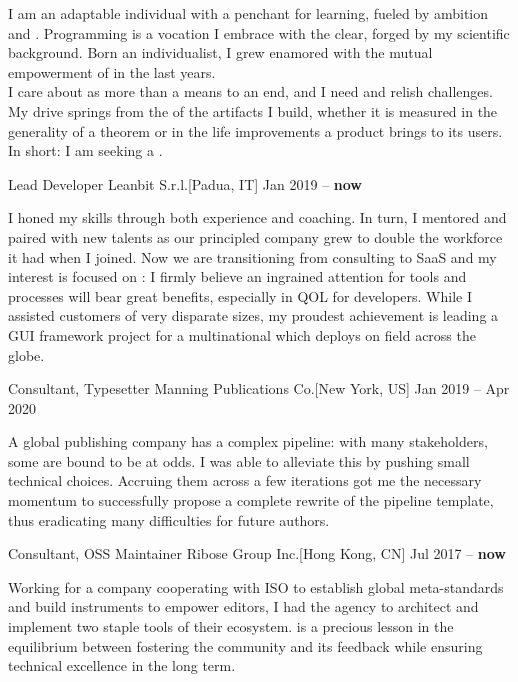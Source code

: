 \documentclass[9pt]{scrartcl}
\def\Phi{1.618}
\newlength{\Pad}\setlength{\Pad}{14.562pt} %
\begin{document}

I am an adaptable individual with a penchant for learning, fueled by ambition
and .
Programming is a vocation I embrace with the clear, 
forged by my scientific background.
Born an individualist, I grew enamored with the mutual empowerment of
 in the last years.\\[\smallskipamount]
I care about  as more than a means to an end, and
I need and relish challenges.
My drive springs from the  of the artifacts I build, whether
it is measured in the generality of a theorem or in the life improvements a
product brings to its users. In short: I am seeking a .


\Event
  {Lead Developer}
  {Leanbit S.r.l.}[Padua, IT]
  {Jan 2019 -- \textbf{now}}

I honed my  skills through both experience and coaching. In
turn, I mentored and paired with new talents as our  principled company
grew to double the workforce it had when I joined.
%
Now we are transitioning from consulting to SaaS and my interest is focused on
: I firmly believe an ingrained attention for
tools and processes will bear great benefits, especially in QOL for
developers.
%
While I assisted customers of very disparate sizes, my proudest achievement is
leading a GUI framework project for a multinational which deploys on field
across the globe.

\smallskip

\Event
  {Consultant, Typesetter}
  {Manning Publications Co.}[New York, US]
  {Jan 2019 -- Apr 2020}

A global publishing company has a complex pipeline: with many stakeholders, some
are bound to be at odds. I was able to alleviate this by pushing small
 technical choices.
%
Accruing them across a few iterations got me the necessary momentum to
successfully propose a complete rewrite of the  pipeline template,
thus eradicating many difficulties for future authors.

\smallskip

\Event
  {Consultant, OSS Maintainer}
  {Ribose Group Inc.}[Hong Kong, CN]
  {Jul 2017 -- \textbf{now}}

Working for a company cooperating with ISO to establish global meta-standards
and build instruments to empower editors, I had the agency to architect and
implement two staple  tools of their ecosystem.
%
 is a precious lesson in the equilibrium between
fostering the community and its feedback while ensuring technical excellence in
the long term.
\end{document}
